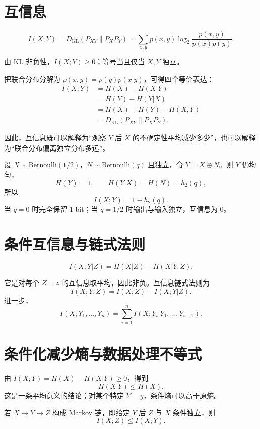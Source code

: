 \section{互信息}

\begin{definition}[互信息]
\[
I(X;Y)=D_{\mathrm{KL}}(P_{XY}\|P_XP_Y)
=\sum_{x,y}p(x,y)\log_2\frac{p(x,y)}{p(x)p(y)}.
\]
\end{definition}

由 KL 非负性，$I(X;Y)\ge0$；等号当且仅当 $X,Y$ 独立。

把联合分布分解为 $p(x,y)=p(y)p(x|y)$，可得四个等价表达：
\begin{align*}
I(X;Y)
&=H(X)-H(X|Y)\\
&=H(Y)-H(Y|X)\\
&=H(X)+H(Y)-H(X,Y)\\
&=D_{\mathrm{KL}}(P_{XY}\|P_XP_Y).
\end{align*}

因此，互信息既可以解释为“观察 $Y$ 后 $X$ 的不确定性平均减少多少”，也可以解释为“联合分布偏离独立分布多远”。

\begin{example}[带噪复制]
设 $X\sim\mathrm{Bernoulli}(1/2)$，$N\sim\mathrm{Bernoulli}(q)$ 且独立，令 $Y=X\oplus N$。则 $Y$ 仍均匀，
\[
H(Y)=1,\qquad H(Y|X)=H(N)=h_2(q),
\]
所以
\[
I(X;Y)=1-h_2(q).
\]
当 $q=0$ 时完全保留 1 bit；当 $q=1/2$ 时输出与输入独立，互信息为 0。
\end{example}

\section{条件互信息与链式法则}

\begin{definition}[条件互信息]
\[
I(X;Y|Z)=H(X|Z)-H(X|Y,Z).
\]
\end{definition}
它是对每个 $Z=z$ 的互信息取平均，因此非负。互信息链式法则为
\[
I(X;Y,Z)=I(X;Z)+I(X;Y|Z).
\]
进一步，
\[
I(X;Y_1,\dots,Y_n)
=\sum_{i=1}^n I(X;Y_i|Y_1,\dots,Y_{i-1}).
\]

\section{条件化减少熵与数据处理不等式}

由 $I(X;Y)=H(X)-H(X|Y)\ge0$，得到
\[
H(X|Y)\le H(X).
\]
这是一条平均意义的结论；对某个特定 $Y=y$，条件熵可以高于原熵。

\begin{theorem}[数据处理不等式]
若 $X\to Y\to Z$ 构成 Markov 链，即给定 $Y$ 后 $Z$ 与 $X$ 条件独立，则
\[
I(X;Z)\le I(X;Y).
\]
\end{theorem}

